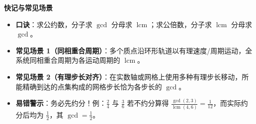 \textbf{快记与常见场景}
\begin{itemize}
\item \textbf{口诀}：求公约数，分子求 $\gcd$ 分母求 $\operatorname{lcm}$；求公倍数，分子求 $\operatorname{lcm}$ 分母求 $\gcd$。
\item \textbf{常见场景 1（同相重合周期）}：多个质点沿环形轨道以有理速度/周期运动，全系统同相重合周期为各运动周期的 $\operatorname{lcm}$。
\item \textbf{常见场景 2（有理步长对齐）}：在实数轴或网格上使用多种有理步长移动，所能精确到达的点集构成的网格步长恰为各步长的 $\gcd$。
\item \textbf{易错警示}：务必先约分！例：$\frac{2}{4}$ 与 $\frac{3}{6}$ 若不约分算得 $\frac{\gcd(2,3)}{\operatorname{lcm}(4,6)} = \frac{1}{12}$，而实际约分后均为 $\frac{1}{2}$，其 $\gcd = \frac{1}{2}$。
\end{itemize}
